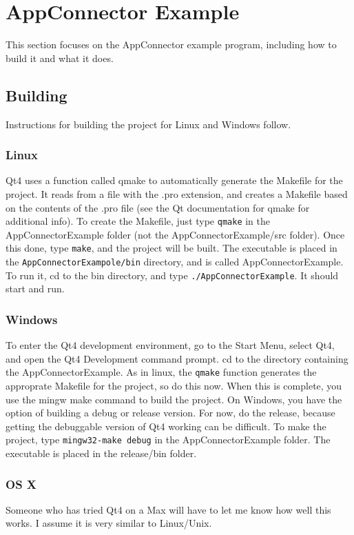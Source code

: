 \section{AppConnector Example}
This section focuses on the AppConnector example program, including how to build it and what it does.
\subsection{Building}
Instructions for building the project for Linux and Windows follow.
\subsubsection{Linux}
Qt4 uses a function called qmake to automatically generate the Makefile for the project. It reads from a file with the .pro extension, and creates a Makefile based on the contents of the .pro file (see the Qt documentation for qmake for additional info). To create the Makefile, just type \texttt{qmake} in the AppConnectorExample folder (not the AppConnectorExample/src folder). Once this done, type \texttt{make}, and the project will be built. The executable is placed in the \texttt{AppConnectorExampole/bin} directory, and is called AppConnectorExample. To run it, cd to the bin directory, and type \texttt{./AppConnectorExample}. It should start and run.
\subsubsection{Windows}
To enter the Qt4 development environment, go to the Start Menu, select Qt4, and open the Qt4 Development command prompt. cd to the directory containing the AppConnectorExample. As in linux, the \texttt{qmake} function generates the approprate Makefile for the project, so do this now. When this is complete, you use the mingw make command to build the project. On Windows, you have the option of building a debug or release version. For now, do the release, because getting the debuggable version of Qt4 working can be difficult. To make the project, type \texttt{mingw32-make debug} in the AppConnectorExample folder. The executable is placed in the release/bin folder.

\subsubsection{OS X}
Someone who has tried Qt4 on a Max will have to let me know how well this works. I assume it is very similar to Linux/Unix.

